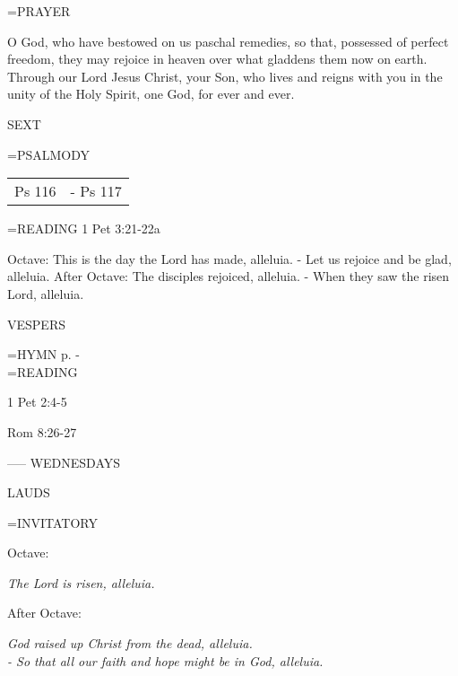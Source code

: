 \hangindent=\parindent \small PRAYER
\begin{description}[labelindent=\parindent, leftmargin=*]
\item [Octave:] 	O God, who have bestowed on us paschal remedies, so that, possessed of perfect freedom, they may rejoice in heaven over what gladdens them now on earth. Through our Lord Jesus Christ, your Son, who lives and reigns with you in the unity of the Holy Spirit, one God, for ever and ever.
\item [After Octave:] 	
\end{description}

\begin{flushleft}\normalsize SEXT\\\end{flushleft}
\hangindent=\parindent \small{PSALMODY}
\begin{center}
\begin{tabular}{ l l }
Ps 116 &  - Ps 117\\
\end{tabular}
\end{center}		

\hangindent=\parindent \small{\uppercase{READING}}    1 Pet 3:21-22a \textbf{   \\}

Octave:	This is the day the Lord has made, alleluia.
		- Let us rejoice and be glad, alleluia.
After Octave:	The disciples rejoiced, alleluia.
		- When they saw the risen Lord, alleluia.

\begin{flushleft}\normalsize VESPERS\\\end{flushleft}
\hangindent=\parindent \small{\uppercase{HYMN} p. \pageref{easter:firstHymn}-\pageref{easter:lastHymn}\\}
\hangindent=\parindent \small READING
\begin{description}[labelindent=\parindent, leftmargin=*]
\item [1st-6th Week:]     1 Pet 2:4-5 \textbf{    \\}
\item [7th Week:]     Rom 8:26-27 \textbf{    \\}
\end{description}

-----
WEDNESDAYS

\begin{flushleft}\normalsize LAUDS\\\end{flushleft}
\hangindent=\parindent \small{INVITATORY}
\begin{center}
\end{center}Octave:\begin{center}\textit{	The Lord is risen, alleluia.\\}
\end{center}After Octave:\begin{center}\textit{	God raised up Christ from the dead, alleluia.\\}
\textit{		- So that all our faith and hope might be in God, alleluia.\\}
\end{center}

